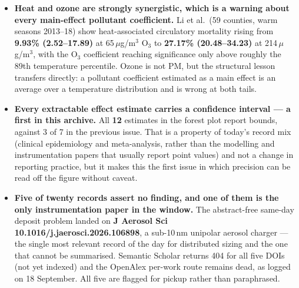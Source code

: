 \documentclass[10pt]{article}
\begin{document}
\begin{itemize}
PM$_{2.5}$ days raised ED visits \textbf{0.020 (95\% CI 0.013--0.027)} and hospitalisations
\textbf{0.017 (0.012--0.022)} per 1,000 resident-days. The absolute magnitudes are tiny
and the exposure is a county-level outdoor value dichotomised at 9\,$\mu$g/m$^3$ applied
to a population that is almost never outdoors --- the HVAC infiltration the authors name
as the mechanism is nowhere measured. The policy asymmetry is the finding:
\textbf{nursing facilities are regulated on indoor temperature and not at all on indoor
particles}.
\item \textbf{Heat and ozone are strongly synergistic, which is a warning about every
main-effect pollutant coefficient.} Li et al.\ (59 counties, warm seasons 2013--18) show
heat-associated circulatory mortality rising from \textbf{9.93\% (2.52--17.89)} at
65\,$\mu$g/m$^3$ O$_3$ to \textbf{27.17\% (20.48--34.23)} at 214\,$\mu$g/m$^3$, with the
O$_3$ coefficient reaching significance only above roughly the 89th temperature
percentile. Ozone is not PM, but the structural lesson transfers directly: a pollutant
coefficient estimated as a main effect is an average over a temperature distribution and
is wrong at both tails.
\item \textbf{Every extractable effect estimate carries a confidence interval --- a first
in this archive.} All \textbf{12} estimates in the forest plot report bounds, against 3 of
7 in the previous issue. That is a property of today's record mix (clinical epidemiology
and meta-analysis, rather than the modelling and instrumentation papers that usually
report point values) and not a change in reporting practice, but it makes this the first
issue in which precision can be read off the figure without caveat.
\item \textbf{Five of twenty records assert no finding, and one of them is the only
instrumentation paper in the window.} The abstract-free same-day deposit problem landed on
\textbf{J Aerosol Sci 10.1016/j.jaerosci.2026.106898}, a sub-10\,nm unipolar aerosol
charger --- the single most relevant record of the day for distributed sizing and the one
that cannot be summarised. Semantic Scholar returns 404 for all five DOIs (not yet
indexed) and the OpenAlex per-work route remains dead, as logged on 18 September. All five
are flagged for pickup rather than paraphrased.
\end{itemize}

\vspace{3mm}
\end{document}
